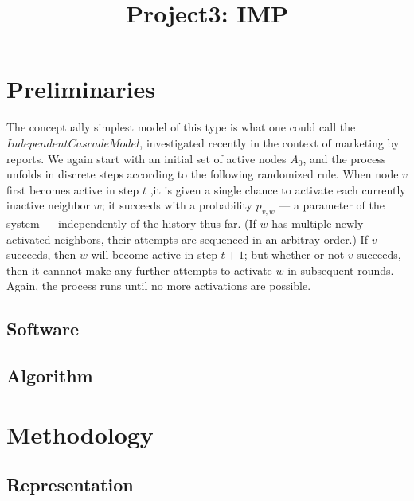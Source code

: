 \documentclass[conference,compsoc]{IEEEtran}
\begin{document}
\title{Project3: IMP}

\author{
}
\maketitle

\IEEEpeerreviewmaketitle


\section{Preliminaries}

The conceptually simplest model of this type is what one could call the
$Independent Cascade Model$, investigated recently in the context of
marketing by reports. We again start with an initial set of active nodes
$A_0$, and the process unfolds in discrete steps according to the
following randomized rule. When node $v$ first becomes active in step $t$
,it is given a single chance to activate each currently inactive
neighbor $w$; it succeeds with a probability $p_{v,w}$ --- a parameter of
the system --- independently of the history thus far. (If $w$ has multiple
newly activated neighbors, their attempts are sequenced in an arbitray 
order.) If $v$ succeeds, then $w$ will become active in step $t+1$; but
whether or not $v$ succeeds, then it cannnot make any further attempts
to activate $w$ in subsequent rounds. Again, the process runs until no
more activations are possible.

\subsection{Software}


\subsection{Algorithm}
   


\section{Methodology}

\subsection{Representation}
\end{document}
